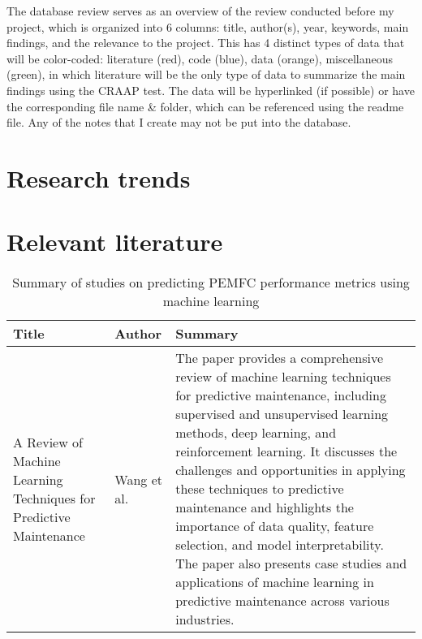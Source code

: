 The database review serves as an overview of the review conducted before my project, which is organized into 6 columns: title, author(s), year, keywords, main findings, and the relevance to the project. This has 4 distinct types of data that will be color-coded: literature (red), code (blue), data (orange), miscellaneous (green), in which literature will be the only type of data to summarize the main findings using the CRAAP test. The data will be hyperlinked (if possible) or have the corresponding file name \& folder, which can be referenced using the readme file. Any of the notes that I create may not be put into the database.  
\section{Research trends}
    
\section{Relevant literature}

    \newpage \begin{table}[H]
    \centering
    \begin{tabularx}{\textwidth}{HIJ} %
    \toprule
    \textbf{Title} & \textbf{Author} & \textbf{Summary} \\ 
    \midrule
    A Review of Machine Learning Techniques for Predictive Maintenance & Wang et al. & The paper provides a comprehensive review of machine learning techniques for predictive maintenance, including supervised and unsupervised learning methods, deep learning, and reinforcement learning. It discusses the challenges and opportunities in applying these techniques to predictive maintenance and highlights the importance of data quality, feature selection, and model interpretability. The paper also presents case studies and applications of machine learning in predictive maintenance across various industries. \\

    \bottomrule
    \end{tabularx}
    \caption{Summary of studies on predicting PEMFC performance metrics using machine learning}
    \end{table}